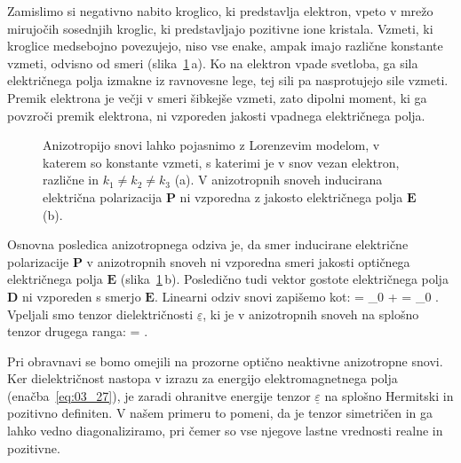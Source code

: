 Zamislimo si negativno nabito kroglico, ki predstavlja elektron, vpeto v 
mrežo mirujočih sosednjih kroglic, ki predstavljajo pozitivne ione kristala. 
Vzmeti, ki kroglice medsebojno povezujejo, niso vse enake, ampak imajo različne 
konstante vzmeti, odvisno od smeri (slika~\ref{fig:10_model}\,a). Ko na elektron
vpade svetloba, ga sila električnega polja izmakne iz ravnovesne lege, tej sili 
pa nasprotujejo sile vzmeti. Premik elektrona je večji v smeri šibkejše vzmeti, 
zato dipolni moment, ki ga povzroči premik elektrona, ni vzporeden jakosti 
vpadnega električnega
polja. 
\begin{figure}[!h]
\centering
\def\svgwidth{120truemm} 

\caption{Anizotropijo snovi lahko pojasnimo z Lorenzevim modelom, v katerem so
konstante vzmeti, s katerimi je v snov vezan elektron, različne  in $k_1 \neq k_2 \neq k_3$ (a).
V anizotropnih snoveh inducirana električna polarizacija $\mathbf{P}$ ni vzporedna 
z jakosto električnega polja $\mathbf{E}$ (b).}
\label{fig:10_model}
\end{figure}

Osnovna posledica anizotropnega odziva je, da smer inducirane električne polarizacije $\mathbf{P}$
 v anizotropnih snoveh ni vzporedna smeri jakosti optičnega električnega polja $\mathbf{E}$ 
(slika~\ref{fig:10_model}\,b). Posledično tudi 
vektor gostote električnega polja $\mathbf{D}$ ni vzporeden s smerjo $\mathbf{E}$. 
Linearni odziv snovi zapišemo kot:
\beq
{} = \varepsilon_0  +  = \varepsilon_0 \underline{\varepsilon} .
\label{eq:10_001}
\eeq
Vpeljali smo tenzor dielektričnosti $\underline{\varepsilon}$, ki je v anizotropnih snoveh na splošno 
tenzor drugega ranga:
\beq
\underline{\varepsilon} = 
\!\!.
\label{eq:10_002}
\eeq
\begin{remark}
Pri obravnavi se bomo omejili na prozorne optično neaktivne anizotropne snovi. 
Ker dielektričnost nastopa v izrazu za energijo elektromagnetnega polja 
(enačba~\ref{eq:03_27}), je zaradi ohranitve energije tenzor $\underline{\varepsilon}$ na splošno
Hermitski in pozitivno definiten. V našem primeru to pomeni, da je 
tenzor simetričen in ga lahko vedno diagonaliziramo, pri čemer so 
vse njegove lastne vrednosti realne in pozitivne.
\end{remark}

